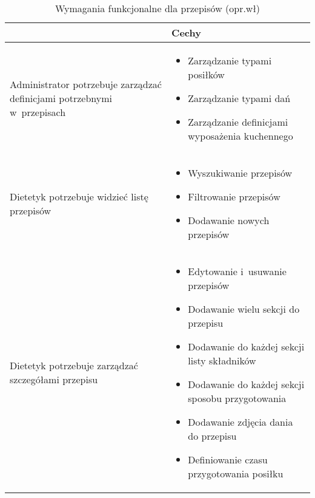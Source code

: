 \begin{minipage}{\textwidth}
    \begin{table}[H]
        \centering\caption{Wymagania funkcjonalne dla przepisów (opr.wł)\label{tabela:wymaganiaFunkcjonalnePrzepisy}}
        \begin{tabular}{|P{.3\textwidth}|P{.6\textwidth}|}
            \hline
             & Cechy \\

            \hline
            Administrator potrzebuje zarządzać definicjami potrzebnymi w~przepisach &
            \begin{itemize}
                \item Zarządzanie typami posiłków
                \item Zarządzanie typami dań
                \item Zarządzanie definicjami wyposażenia kuchennego
            \end{itemize} \\
            \hline
            Dietetyk potrzebuje widzieć listę przepisów &
            \begin{itemize}
                \item Wyszukiwanie przepisów
                \item Filtrowanie przepisów
                \item Dodawanie nowych przepisów
            \end{itemize} \\
            \hline
            Dietetyk potrzebuje zarządzać szczegółami przepisu &
            \begin{itemize}
                \item Edytowanie i~usuwanie przepisów
                \item Dodawanie wielu sekcji do przepisu
                \item Dodawanie do każdej sekcji listy składników
                \item Dodawanie do każdej sekcji sposobu przygotowania
                \item Dodawanie zdjęcia dania do przepisu
                \item Definiowanie czasu przygotowania posiłku
            \end{itemize} \\
            \hline
        \end{tabular}
    \end{table}
\end{minipage}


